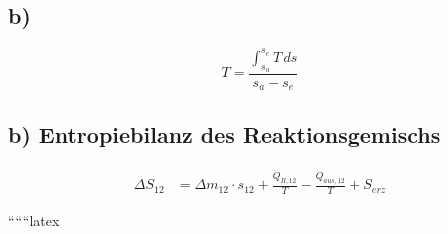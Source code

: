 

\subsection*{b)}
\[
T = \frac{\int_{s_a}^{s_e} T \, ds}{s_a - s_e}
\]

\subsection*{b) Entropiebilanz des Reaktionsgemischs}

\begin{align*}
\Delta S_{12} &= \Delta m_{12} \cdot s_{12} + \frac{\dot{Q}_{R,12}}{T} - \frac{\dot{Q}_{aus,12}}{T} + S_{erz}
\end{align*}

``````latex